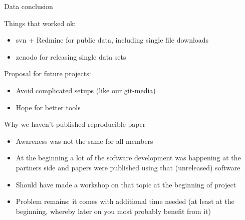 \documentclass{beamer}
\begin{document}
\begin{frame}{Data conclusion}

    Things that worked ok:
    \begin{itemize}
        \item svn + Redmine for public data, including single file downloads
        \item zenodo for releasing single data sets
    \end{itemize}

    \vspace{0.6cm}

    Proposal for future projects:
    \begin{itemize}
        \item Avoid complicated setups (like our git-media)
        \item Hope for better tools
    \end{itemize}

\end{frame}

\begin{frame}{Why we haven't published reproducible paper}

    \begin{itemize}
        \item Awareness was not the same for all members
        \item At the beginning a lot of the software development was happening
            at the partners side and papers were published using that
            (unreleased) software
        \item Should have made a workshop on that topic at the beginning of
            project
        \item Problem remains: it comes with additional time needed (at least at
            the beginning, whereby later on you most probably benefit from it)
    \end{itemize}

\end{frame}
\end{document}
